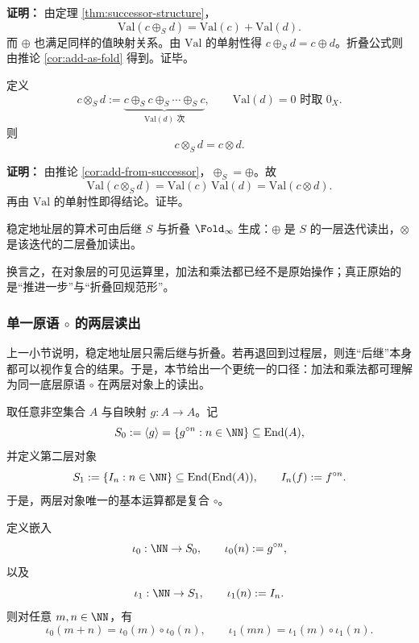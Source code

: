 \textbf{证明：}
由定理 \ref{thm:successor-structure}，
\[
\mathrm{Val}(c\oplus_S d)=\mathrm{Val}(c)+\mathrm{Val}(d).
\]
而 \(\oplus\) 也满足同样的值映射关系。由 \(\mathrm{Val}\) 的单射性得 \(c\oplus_S d=c\oplus d\)。折叠公式则由推论 \ref{cor:add-as-fold} 得到。证毕。

\begin{theorem}[乘法由后继迭代内生]\label{thm:mul-from-successor}
定义
\[
c\otimes_S d
:=
\underbrace{c\oplus_S c\oplus_S\cdots\oplus_S c}_{\mathrm{Val}(d)\text{ 次}},
\qquad
\mathrm{Val}(d)=0\text{ 时取 }0_X.
\]
则
\[
c\otimes_S d=c\otimes d.
\]
\end{theorem}

\textbf{证明：}
由推论 \ref{cor:add-from-successor}，\(\oplus_S=\oplus\)。故
\[
\mathrm{Val}(c\otimes_S d)=\mathrm{Val}(c)\,\mathrm{Val}(d)=\mathrm{Val}(c\otimes d).
\]
再由 \(\mathrm{Val}\) 的单射性即得结论。证毕。

\begin{corollary}[极简原语集]\label{cor:primitive-minimal-successor}
稳定地址层的算术可由后继 \(S\) 与折叠 \(\Fold_\infty\) 生成：\(\oplus\) 是 \(S\) 的一层迭代读出，\(\otimes\) 是该迭代的二层叠加读出。
\end{corollary}

换言之，在对象层的可见运算里，加法和乘法都已经不是原始操作；真正原始的是“推进一步”与“折叠回规范形”。

\subsubsection{单一原语 \texorpdfstring{$\circ$}{o} 的两层读出}\label{subsec:arith-composition}
上一小节说明，稳定地址层只需后继与折叠。若再退回到过程层，则连“后继”本身都可以视作复合的结果。于是，本节给出一个更统一的口径：加法和乘法都可理解为同一底层原语 \(\circ\) 在两层对象上的读出。

取任意非空集合 \(A\) 与自映射 \(g:A\to A\)。记
\[
S_0:=\langle g\rangle=\{g^{\circ n}:n\in\NN\}\subseteq \mathrm{End}(A),
\]
并定义第二层对象
\[
S_1:=\{I_n:n\in\NN\}\subseteq \mathrm{End}(\mathrm{End}(A)),
\qquad
I_n(f):=f^{\circ n}.
\]
于是，两层对象唯一的基本运算都是复合 \(\circ\)。

\begin{theorem}\label{thm:composition-two-layer}
定义嵌入
\[
\iota_0:\NN\to S_0,\qquad \iota_0(n):=g^{\circ n},
\]
以及
\[
\iota_1:\NN\to S_1,\qquad \iota_1(n):=I_n.
\]
则对任意 \(m,n\in\NN\)，有
\[
\iota_0(m+n)=\iota_0(m)\circ \iota_0(n),
\qquad
\iota_1(mn)=\iota_1(m)\circ \iota_1(n).
\]
\end{theorem}

